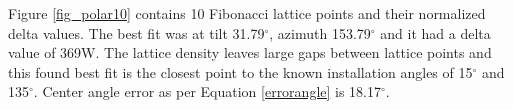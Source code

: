 Figure \ref{fig_polar10} contains 10 Fibonacci lattice points and their normalized delta values. The best fit was at tilt 31.79$^\circ$, azimuth 153.79$^\circ$ and it had a delta value of 369W. The lattice density leaves large gaps between lattice points and this found best fit is the closest point to the known installation angles of 15$^\circ$ and 135$^\circ$. Center angle error as per Equation \ref{errorangle} is 18.17$^\circ$.






